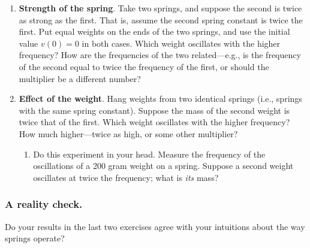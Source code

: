 \begin{enumerate}
\item {\bf Strength of the spring}.  Take two springs, and suppose the
second is twice as strong as the first.  That is, assume the second
spring constant is twice the first.  Put equal weights on the ends of
the two springs, and use the initial value $v(0)=0$ in both cases.
Which weight oscillates with the higher frequency?  How are the
frequencies of the two related---e.g., is the frequency of the second
equal to twice the frequency of the first, or should the multiplier be
a different number?


\item {\bf Effect of the weight}.  Hang weights from two identical
springs (i.e., springs with the same spring constant).  Suppose the
mass of the second weight is twice that of the first.  Which weight
oscillates with the higher frequency?  How much higher---twice as
high, or some other multiplier?

  \begin{enumerate}
  \item Do this experiment in your head.  Measure the frequency of the
oscillations of a 200 gram weight on a spring.  Suppose a second
weight oscillates at twice the frequency; what is {\em its\/} mass?





  \end{enumerate}
\end{enumerate}
\subsubsection{A reality check.}
Do your results in the last two exercises agree
with your intuitions about the way springs operate?


